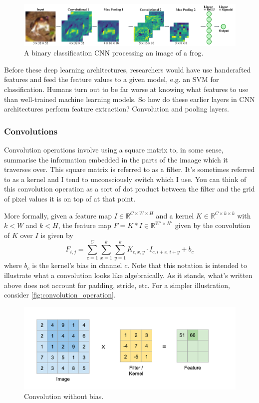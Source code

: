 \documentclass[11pt]{article}
\begin{document}
\begin{figure}[ht]
    \centering
    \includegraphics[width=1\textwidth]{./figures/neural_nets/CNN_frog.pdf}
    \caption{A binary classification CNN processing an image of a frog.}
    \label{fig:CNN_frog}
\end{figure}

Before these deep learning architectures, researchers would have use handcrafted features and feed the feature values to a given model, e.g. an SVM for classification. Humans turn out to be far worse at knowing what features to use than well-trained machine learning models. So how do these earlier layers in CNN architectures perform feature extraction? Convolution and pooling layers.

\subsubsection{Convolutions}
Convolution operations involve using a square matrix to, in some sense, summarise the information embedded in the parts of the imaage which it traverses over. This square matrix is referred to as a filter. It's sometimes referred to as a kernel and I tend to unconsciously switch which I use. You can think of this convolution operation as a sort of dot product between the filter and the grid of pixel values it is on top of at that point.

More formally, given a feature map $I\in\mathbb{R}^{C\times W\times H}$ and a kernel $K\in\mathbb{R}^{C\times k\times k}$ with $k<W$ and $k<H$, the feature map $F=K*I\in\mathbb{R}^{W'\times H'}$ given by the convolution of $K$ over $I$ is given by
$$
F_{i,j}
=
\sum_{c=1}^C\sum_{x=1}^{k}\sum_{y=1}^{k}K_{c,x,y}\cdot I_{c,i+x,i+y}+b_c
$$
where $b_c$ is the kernel's bias in channel $c$. Note that this notation is intended to illustrate what a convolution looks like algebraically. As it stands, what's written above does not account for padding, stride, etc. For a simpler illustration, consider \autoref{fig:convolution_operation}.

\begin{figure}[ht]
    \centering
    \includegraphics[width=1\textwidth]{./figures/neural_nets/CNN_convolution.png}
    \caption{Convolution without bias.}
    \label{fig:convolution_operation}
\end{figure}
\end{document}
